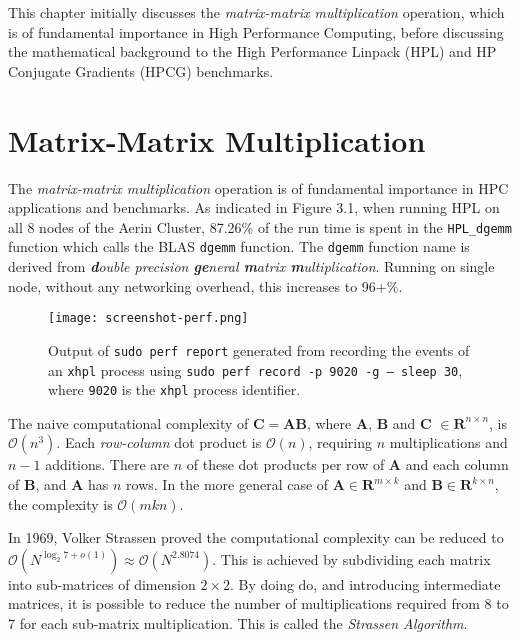 This chapter initially discusses the \emph{matrix-matrix multiplication} operation, which is of fundamental importance in High Performance Computing, before discussing the mathematical background to the High Performance Linpack (HPL) and HP Conjugate Gradients (HPCG) benchmarks.


%
%
\section{Matrix-Matrix Multiplication}

The \emph{matrix-matrix multiplication} operation is of fundamental importance in HPC applications and benchmarks. As indicated in Figure 3.1, when running HPL on all 8 nodes of the Aerin Cluster, 87.26\% of the run time is spent in the \verb|HPL_dgemm| function which calls the BLAS \verb|dgemm| function. The \verb|dgemm| function name is derived from \emph{\textbf{d}ouble precision \textbf{ge}neral \textbf{m}atrix \textbf{m}ultiplication}. Running on single node, without any networking overhead, this increases to 96+\%.

\begin{figure}[h]
	\centering	
	\texttt{[image: screenshot-perf.png]}
	\caption{Output of \texttt{sudo perf report} generated from recording the events of an \texttt{xhpl} process using \texttt{sudo perf record -p 9020 -g -- sleep 30}, where \texttt{9020} is the \texttt{xhpl} process identifier.}
\end{figure}

The naive computational complexity of $\mathbf{C} = \mathbf{AB}$, where $\mathbf{A}$, $\mathbf{B}$ and $\mathbf{C}$ $\in \mathbf{R}^{n \times n}$, is $\mathcal{O}(n^3)$. Each \emph{row-column} dot product is $\mathcal{O}(n)$, requiring $n$ multiplications and $n - 1$ additions. There are $n$ of these dot products per row of $\mathbf{A}$ and each column of $\mathbf{B}$, and $\mathbf{A}$ has $n$ rows. In the more general case of $\mathbf{A} \in \mathbf{R}^{m \times k}$ and $\mathbf{B} \in \mathbf{R}^{k \times n}$, the complexity is $\mathcal{O}(mkn).$ 

In 1969, Volker Strassen proved the computational complexity can be reduced to $\mathcal{O}(N^{\log _{2}7+o(1)})\approx \mathcal{O}(N^{2.8074})$. This is achieved by subdividing each matrix into sub-matrices of dimension $2 \times 2$. By doing do, and introducing intermediate matrices, it is possible to reduce the number of multiplications required from 8 to 7 for each sub-matrix multiplication. This is called the \emph{Strassen Algorithm}.

